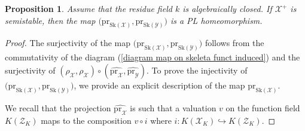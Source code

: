 \documentclass{amsart}%
\numberwithin{equation}{subsection}
\theoremstyle{plain2}
\newtheorem{prop}[equation]{Proposition}
\theoremstyle{definition2}
\theoremstyle{stepstyle}
\theoremstyle{point}
\theoremstyle{subpoint}
\newcommand{\cX}{\ensuremath{\mathscr{X}}}
\newcommand{\cY}{\ensuremath{\mathscr{Y}}}
\newcommand{\cZ}{\ensuremath{\mathscr{Z}}}
\renewcommand{\cY}{\ensuremath{\mathscr{Y}}}
\newcommand{\pr}{\mathrm{pr}}
\newcommand{\Sk}{\mathrm{Sk}}
\begin{document}
\begin{prop}  \label{prop semistability and skeleta}
Assume that the residue field $k$ is algebraically closed.  If $\cX^+$ is semistable, then the map $\big(\pr_{\Sk(\cX)}, \pr_{\Sk(\cY)}\big)$ is a PL homeomorphism.
\end{prop}
\begin{proof}
The surjectivity of the map $\big(\pr_{\Sk(\cX)}, \pr_{\Sk(\cY)}\big)$ follows from the commutativity of the diagram (\ref{diagram map on skeleta funct induced}) and the surjectivity of $(\rho_\cX, \rho_\cX) \circ (\widehat{\pr_{\cX}}, \widehat{\pr_{\cY}})$. To prove the injectivity of $\big(\pr_{\Sk(\cX)}, \pr_{\Sk(\cY)}\big)$, we provide an explicit description of the map $\pr_{\Sk(\cX)}$.

We recall that the projection $\widehat{\pr_{\cX}}$ is such that a valuation $v$ on the function field $K(\cZ_K)$ maps to the composition $v \circ i$ where $i:K(\cX_K) \hookrightarrow K(\cZ_K)$.


\end{proof}
\end{document}
